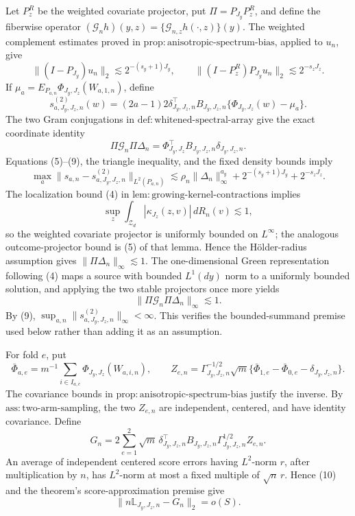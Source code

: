 Let \(P_z^R\) be the weighted covariate projector, put \(\Pi=P_{J_y}P_z^R\), and define the fiberwise operator \((\mathcal G_nh)(y,z)=\{\mathcal G_{n,z}h(\cdot,z)\}(y)\). The weighted complement estimates proved in \(\mathrm{prop{:}anisotropic\text{-}spectrum\text{-}bias}\), applied to \(u_n\), give
\[
\|(I-P_{J_y})u_n\|_2\lesssim2^{-(s_y+1)J_y},
\qquad
\|(I-P_z^R)P_{J_y}u_n\|_2\lesssim2^{-s_zJ_z}. \tag{8}
\]
If \(\mu_a=E_{P_{a,n}}\Phi_{J_y,J_z}(W_{a,1,n})\), define
\[
s^{(2)}_{a,J_y,J_z,n}(w)
=(2a-1)2\delta_{J_y,J_z,n}^{\top}B_{J_y,J_z,n}
\{\Phi_{J_y,J_z}(w)-\mu_a\}.
\]
The two Gram conjugations in \(\mathrm{def{:}whitened\text{-}spectral\text{-}array}\) give the exact coordinate identity
\[
\Pi\mathcal G_n\Pi\Delta_n
=\Phi_{J_y,J_z}^{\top}B_{J_y,J_z,n}\delta_{J_y,J_z,n}. \tag{9}
\]
Equations (5)--(9), the triangle inequality, and the fixed density bounds imply
\[
\max_a\|s_{a,n}-s^{(2)}_{a,J_y,J_z,n}\|_{L^2(P_{a,n})}
\lesssim
\rho_n\|\Delta_n\|_\infty^{a_y}
+2^{-(s_y+1)J_y}+2^{-s_zJ_z}. \tag{10}
\]
The localization bound (4) in \(\mathrm{lem{:}growing\text{-}kernel\text{-}contractions}\) implies
\[
\sup_z\int_{\mathcal Z_d}|\kappa_{J_z}(z,v)|\,dR_n(v)\lesssim1,
\]
so the weighted covariate projector is uniformly bounded on \(L^\infty\); the analogous outcome-projector bound is (5) of that lemma. Hence the H\"older-radius assumption gives \(\|\Pi\Delta_n\|_\infty\lesssim1\). The one-dimensional Green representation following (4) maps a source with bounded \(L^1(dy)\) norm to a uniformly bounded solution, and applying the two stable projectors once more yields
\[
\|\Pi\mathcal G_n\Pi\Delta_n\|_\infty\lesssim1.
\]
By (9), \(\sup_{a,n}\|s^{(2)}_{a,J_y,J_z,n}\|_\infty<\infty\). This verifies the bounded-summand premise used below rather than adding it as an assumption.

For fold \(e\), put
\[
\bar\Phi_{a,e}=m^{-1}\sum_{i\in I_{a,e}}\Phi_{J_y,J_z}(W_{a,i,n}),
\qquad
Z_{e,n}=\Gamma_{J_y,J_z,n}^{-1/2}\sqrt m
\{\bar\Phi_{1,e}-\bar\Phi_{0,e}-\delta_{J_y,J_z,n}\}. \tag{11}
\]
The covariance bounds in \(\mathrm{prop{:}anisotropic\text{-}spectrum\text{-}bias}\) justify the inverse. By \(\mathrm{ass{:}two\text{-}arm\text{-}sampling}\), the two \(Z_{e,n}\) are independent, centered, and have identity covariance. Define
\[
G_n=2\sum_{e=1}^2\sqrt m\,
\delta_{J_y,J_z,n}^{\top}B_{J_y,J_z,n}
\Gamma_{J_y,J_z,n}^{1/2}Z_{e,n}. \tag{12}
\]
An average of independent centered score errors having \(L^2\)-norm \(r\), after multiplication by \(n\), has \(L^2\)-norm at most a fixed multiple of \(\sqrt n\,r\). Hence (10) and the theorem's score-approximation premise give
\[
\|n\mathbb L_{J_y,J_z,n}-G_n\|_2=o(S). \tag{13}
\]

